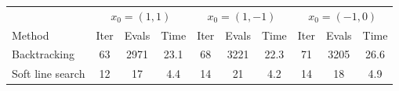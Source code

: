 \begin{tabular}{l|ccc|ccc|ccc} \hline \hline 
& \multicolumn{3}{c}{$x_0 = (1,1)$} & \multicolumn{3}{c}{$x_0 = (1,-1)$} & \multicolumn{3}{c}{$x_0 = (-1,0)$} \\ 
Method & Iter & Evals & Time & Iter & Evals & Time & Iter & Evals & Time \\ \hline 
Backtracking & 63 & 2971 & 23.1 & 68 & 3221 & 22.3 & 71 & 3205 & 26.6 \\ 
Soft line search & 12 & 17 & 4.4 & 14 & 21 & 4.2 & 14 & 18 & 4.9 \\ 
\hline \hline 
\end{tabular} 
